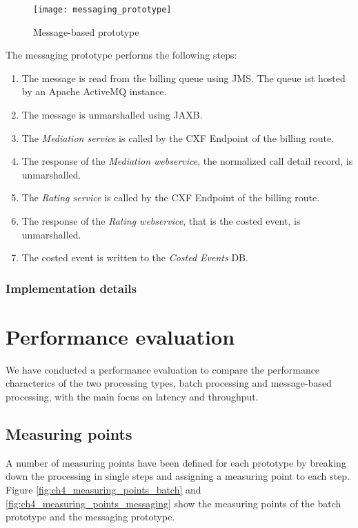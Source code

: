 \begin{figure}[h!]
	\centering
	\texttt{[image: messaging\_prototype]}
	\caption{Message-based prototype}
	\label{fig:ch4_messaging_prototype}
\end{figure}

The messaging prototype performs the following steps:

\begin{enumerate}
	\item The message is read from the billing queue using \ac{JMS}. The queue ist hosted by an Apache ActiveMQ instance.
	\item The message is unmarshalled using \ac{JAXB}.
	\item The \emph{Mediation service} is called by the CXF Endpoint of the billing route.
	\item The response of the \emph{Mediation webservice}, the normalized call detail record, is unmarshalled. 
	\item The \emph{Rating service} is called by the CXF Endpoint of the billing route.
	\item The response of the \emph{Rating webservice}, that is the costed event, is unmarshalled.
	\item The costed event is written to the \emph{Costed Events} DB.
\end{enumerate}

\subsubsection{Implementation details}

\section{Performance evaluation}\label{sec:ch4_evaluation}
We have conducted a performance evaluation to compare the performance characterics of the two processing types, batch processing and message-based processing, with the main focus on latency and throughput.

\subsection{Measuring points}
A number of measuring points have been defined for each prototype by breaking down the processing in single steps and assigning a measuring point to each step. Figure \ref{fig:ch4_measuring_points_batch} and \ref{fig:ch4_measuring_points_messaging} show the measuring points of the batch prototype and the messaging prototype. 

